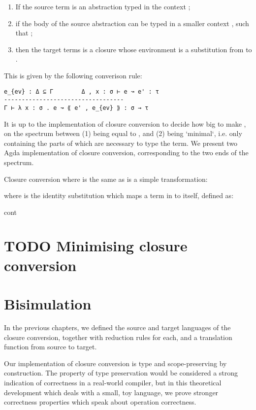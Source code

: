 \documentclass[bsc,frontabs,twoside,singlespacing,parskip,deptreport]{infthesis}
\theoremstyle{definition}
\begin{document}
\begin{enumerate}
\item If the source term is an abstraction typed in the context
  ;
\item if the body of the source abstraction can be typed in a smaller
  context , such that ;
\item then the target terms is a closure whose environment is a
  substitution from  to .
\end{enumerate}

This is given by the following converison rule:

\begin{verbatim}
e_{ev} : Δ ⊆ Γ        Δ , x : σ ⊢ e ↝ e' : τ
----------------------------------
Γ ⊢ λ x : σ . e ↝ ⟪ e' , e_{ev} ⟫ : σ → τ 
\end{verbatim}

It is up to the implementation of closure conversion to decide how big
to make , on the spectrum between (1)  being equal to
, and (2)  being `minimal`, i.e. only containing the parts
of  which are necessary to type the term. We present two Agda
implementation of closure conversion, corresponding to the two ends of
the spectrum.

Closure conversion where  is the same as  is a simple
transformation:


where  is the identity substitution which maps a term
in  to itself, defined as:


cont

\chapter{TODO Minimising closure conversion}

\chapter{Bisimulation}

In the previous chapters, we defined the source and target languages
of the closure conversion, together with reduction rules for each, and
a translation function from source to target.

Our implementation of closure conversion is type and scope-preserving
by construction. The property of type preservation would be considered
a strong indication of correctness in a real-world compiler, but in
this theoretical development which deals with a small, toy language,
we prove stronger correctness properties which speak about operation
correctness.
\end{document}
